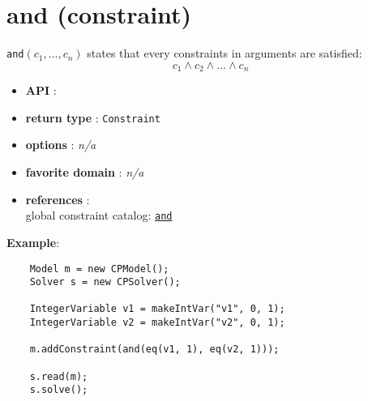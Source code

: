 \label{and}
\hypertarget{and}{}

\section{and (constraint)}\label{and:andconstraint}\hypertarget{and:andconstraint}{}
\begin{notedef}
  \texttt{and}$(c_1,\ldots,c_n)$ states that every constraints in arguments are satisfied:
$$ c_1 \land c_2 \land\ldots\land c_n$$
\end{notedef}

\begin{itemize}
\item \textbf{API} : 
\item \textbf{return type} : \texttt{Constraint}
\item \textbf{options} : \emph{n/a}
\item \textbf{favorite domain} : \emph{n/a}
\item \textbf{references} :\\
  global constraint catalog: \href{http://www.emn.fr/x-info/sdemasse/gccat/Cand.html}{\tt and}
\end{itemize}

\textbf{Example}:
\begin{lstlisting}
	Model m = new CPModel();
	Solver s = new CPSolver();
	
	IntegerVariable v1 = makeIntVar("v1", 0, 1);
	IntegerVariable v2 = makeIntVar("v2", 0, 1);
	
	m.addConstraint(and(eq(v1, 1), eq(v2, 1)));
	
	s.read(m);
	s.solve();
\end{lstlisting}
